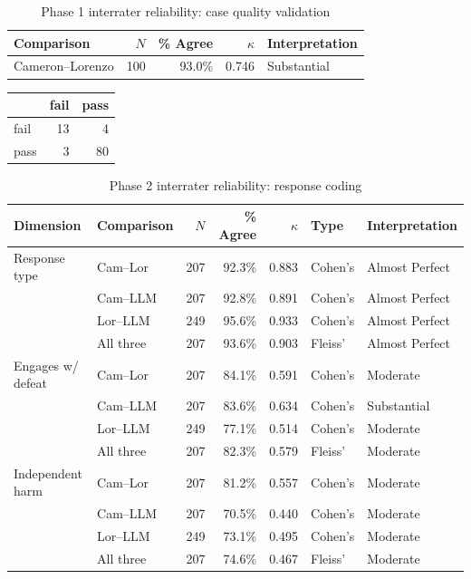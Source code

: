 
\begin{table}[ht]
\centering
\caption{Phase 1 interrater reliability: case quality validation}
\label{tab:phase1-irr}
\begin{tabular}{lrrrl}
\toprule
Comparison & $N$ & \% Agree & $\kappa$ & Interpretation \\
\midrule
Cameron--Lorenzo & 100 & 93.0\% & 0.746 & Substantial \\
\bottomrule
\end{tabular}
\end{table}

\begin{tabular}{lrr}
\toprule
 & fail & pass \\
\midrule
fail & 13 & 4 \\
pass & 3 & 80 \\
\bottomrule
\end{tabular}

\begin{table}[ht]
\centering
\caption{Phase 2 interrater reliability: response coding}
\label{tab:phase2-irr}
\begin{tabular}{llrrrll}
\toprule
Dimension & Comparison & $N$ & \% Agree & $\kappa$ & Type & Interpretation \\
\midrule
Response type & Cam--Lor & 207 & 92.3\% & 0.883 & Cohen's & Almost Perfect \\
 & Cam--LLM & 207 & 92.8\% & 0.891 & Cohen's & Almost Perfect \\
 & Lor--LLM & 249 & 95.6\% & 0.933 & Cohen's & Almost Perfect \\
 & All three & 207 & 93.6\% & 0.903 & Fleiss' & Almost Perfect \\
\midrule
Engages w/ defeat & Cam--Lor & 207 & 84.1\% & 0.591 & Cohen's & Moderate \\
 & Cam--LLM & 207 & 83.6\% & 0.634 & Cohen's & Substantial \\
 & Lor--LLM & 249 & 77.1\% & 0.514 & Cohen's & Moderate \\
 & All three & 207 & 82.3\% & 0.579 & Fleiss' & Moderate \\
\midrule
Independent harm & Cam--Lor & 207 & 81.2\% & 0.557 & Cohen's & Moderate \\
 & Cam--LLM & 207 & 70.5\% & 0.440 & Cohen's & Moderate \\
 & Lor--LLM & 249 & 73.1\% & 0.495 & Cohen's & Moderate \\
 & All three & 207 & 74.6\% & 0.467 & Fleiss' & Moderate \\
\bottomrule
\end{tabular}
\end{table}

